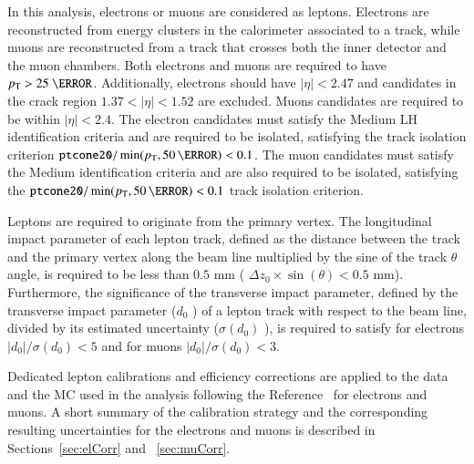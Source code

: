 

In this analysis, electrons or muons are considered as
leptons. Electrons are reconstructed from energy clusters in the
calorimeter associated to a track, while muons are reconstructed from a
track that crosses both the inner detector and the muon chambers. Both electrons and muons are required to
have $\pT>25~\GeV$. Additionally, electrons should have $|\eta|<2.47$
and candidates in the crack region $1.37<|\eta|<1.52$ are
excluded. Muons candidates are required to be within $|\eta|<2.4$. The
electron candidates must satisfy the Medium LH identification criteria
and are required to be isolated, satisfying the track isolation
criterion $\texttt{ptcone20}/\min(\pt, 50\,\GeV) <0.1$.  The muon
candidates must satisfy the Medium identification criteria and are
also required to be isolated, satisfying the
$\texttt{ptcone20}/\min(\pt, 50\,\GeV) <0.1$ track isolation criterion.

Leptons are required to originate from the primary vertex. The
longitudinal impact parameter of each lepton track, defined as the
distance between the track and the primary vertex along the beam line
multiplied by the sine of the track $\theta$ angle, is required to be
less than $0.5$ mm ( $\Delta z_{0}\times \sin(\theta)
<0.5$ mm). Furthermore, the significance of the transverse impact
parameter, defined by the transverse impact parameter ($d_{0}$ ) of a
lepton track with respect to the beam line, divided by its estimated
uncertainty ($\sigma(d_{0})$ ), is required to satisfy for electrons
$|d_0|/\sigma(d_{0}) < 5$ and for muons $|d_0|/\sigma(d_{0}) < 3$.

Dedicated lepton calibrations and efficiency corrections are applied to the data and the MC used in the analysis following the Reference~\cite{lowMuMw:INT1} for electrons and muons. A short summary of the calibration strategy and the corresponding resulting uncertainties for the electrons and muons is described in Sections~\ref{sec:elCorr} and ~\ref{sec:muCorr}.


